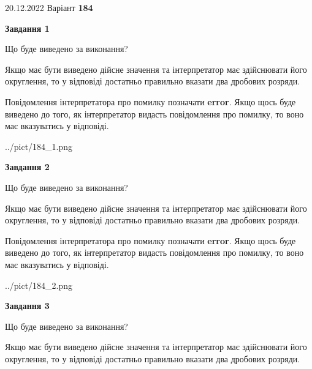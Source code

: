 \documentclass[12pt, ukrainian]{article}
\begin{document}
{20.12.2022 Варіант \No \textbf { 184 }\par}
{
\begin {Large}

{\begin {center}\textbf{Завдання 1}\end {center}}\par
Що буде виведено за виконання? \par

Якщо має бути виведено дійсне значення та інтерпретатор має здійснювати його округлення, 
то у відповіді достатньо правильно вказати два дробових розряди.

Повідомлення інтерпретатора про помилку позначати \textbf{error}.
Якщо щось буде виведено до того, як інтерпретатор видасть повідомлення про помилку, 
то воно має вказуватись у відповіді. \par

\begin{center}
	{../pict/184_1.png}
\end{center}
\newpage

{\begin {center}\textbf{Завдання 2}\end {center}}\par
Що буде виведено за виконання? \par

Якщо має бути виведено дійсне значення та інтерпретатор має здійснювати його округлення, 
то у відповіді достатньо правильно вказати два дробових розряди.

Повідомлення інтерпретатора про помилку позначати \textbf{error}.
Якщо щось буде виведено до того, як інтерпретатор видасть повідомлення про помилку, 
то воно має вказуватись у відповіді. \par

\begin{center}
	{../pict/184_2.png}
\end{center}
\newpage

{\begin {center}\textbf{Завдання 3}\end {center}}\par
Що буде виведено за виконання? \par

Якщо має бути виведено дійсне значення та інтерпретатор має здійснювати його округлення, 
то у відповіді достатньо правильно вказати два дробових розряди.


\end{Large}}
\end{document}
